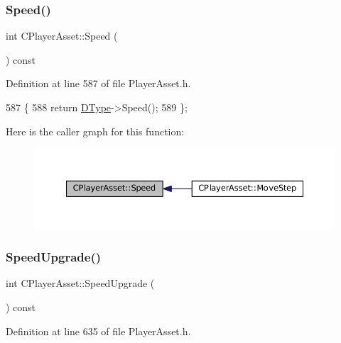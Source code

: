 \subsubsection{\texorpdfstring{Speed()}{Speed()}}
{\footnotesize\ttfamily int C\+Player\+Asset\+::\+Speed (\begin{DoxyParamCaption}{ }\end{DoxyParamCaption}) const\hspace{0.3cm}{\ttfamily [inline]}}



Definition at line 587 of file Player\+Asset.\+h.


\begin{DoxyCode}
587                          \{
588             \textcolor{keywordflow}{return} \hyperlink{classCPlayerAsset_a5d61f73471e1e6f0a6ab15f2ffa7b359}{DType}->Speed(); 
589         \};
\end{DoxyCode}
Here is the caller graph for this function\+:\nopagebreak
\begin{figure}[H]
\begin{center}
\leavevmode
\includegraphics[width=350pt]{classCPlayerAsset_af1c093600f1567e3abf1cefc0f5350d5_icgraph}
\end{center}
\end{figure}
\hypertarget{classCPlayerAsset_a6b6b17c9d4b1fe095120032bee4977af}{}\label{classCPlayerAsset_a6b6b17c9d4b1fe095120032bee4977af} 
\subsubsection{\texorpdfstring{Speed\+Upgrade()}{SpeedUpgrade()}}
{\footnotesize\ttfamily int C\+Player\+Asset\+::\+Speed\+Upgrade (\begin{DoxyParamCaption}{ }\end{DoxyParamCaption}) const\hspace{0.3cm}{\ttfamily [inline]}}



Definition at line 635 of file Player\+Asset.\+h.


